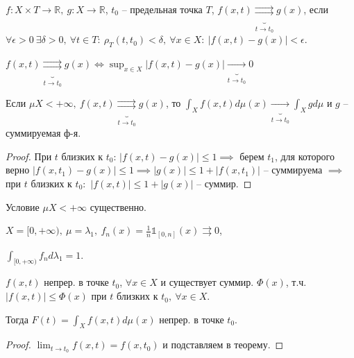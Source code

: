 \begin{definition}
    $f: X \times T \rightarrow \mathbb{R}, \ g: X \rightarrow \mathbb{R}$, $t_0$ -- предельная точка $T$, $f(x, t) \underbrace{\rightrightarrows}_{t \rightarrow t_0} g(x)$, если $\forall \epsilon > 0 \ \exists \delta > 0, \ \forall t \in T: \ \rho_T (t, t_0) < \delta, \ \forall x \in X: \ | f(x, t) - g(x) | < \epsilon$.
\end{definition}

\begin{remark}
    $f(x, t) \underbrace{\rightrightarrows}_{t \rightarrow t_0} g(x) \Leftrightarrow \sup_{x \in X} { | f(x, t) - g(x) | } \underbrace{\rightarrow}_{t \rightarrow t_0} 0$
\end{remark}

\begin{consequence}
    Если $\mu X < +\infty, \ f(x, t) \underbrace{\rightrightarrows}_{t \rightarrow t_0} g(x)$, то $\int_X { f(x, t) d \mu(x) } \underbrace{\rightarrow}_{t \rightarrow t_0} \int_X { g d \mu }$ и $g$ -- суммируемая ф-я.
\end{consequence}

\begin{proof}
    При $t$ близких к $t_0$: $|f(x, t) - g(x)| \leq 1 \implies$ берем $t_1$, для которого верно $|f(x, t_1) - g(x)| \leq 1 \implies |g(x)| \leq 1 + |f(x, t_1)|$ -- суммируема $\implies$ при $t$ близких к $t_0: $ $|f(x, t)| \leq 1 + |g(x)|$ -- суммир.
\end{proof}

\begin{remark}
    Условие $\mu X < +\infty$ существенно.

    $X = [0, +\infty), \ \mu = \lambda_1, \ f_n(x) = \frac{1}{n} \mathds{1}_{[0, n]} (x) \rightrightarrows 0$,

    $\int_{[0, +\infty)} {f_n d \lambda_1} = 1$.
\end{remark}

\begin{consequence}
    $f(x, t)$ непрер. в точке $t_0$, $\forall x \in X$ и существует суммир. $\Phi(x)$, т.ч. $| f(x, t) | \leq \Phi(x)$ при $t$ близких к $t_0, \ \forall x \in X$. 

    Тогда $F(t) = \int_X{ f(x, t) d \mu (x) }$ непрер. в точке $t_0$.
\end{consequence}
\begin{proof}
    $\lim_{t \rightarrow t_0} { f(x, t) } = f(x, t_0)$ и подставляем в теорему.
\end{proof}


